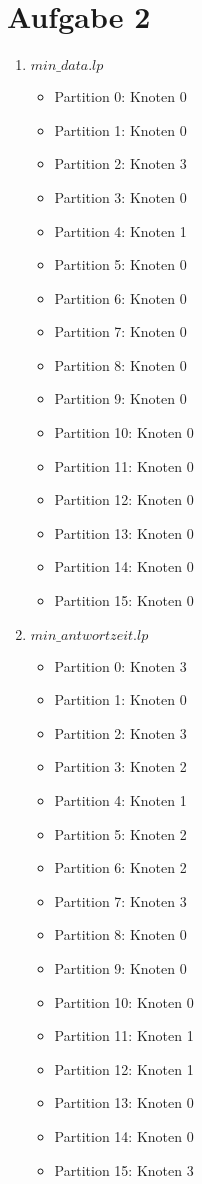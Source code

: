 \documentclass[a4paper]{article}
\begin{document}
\section*{Aufgabe 2}
\begin{enumerate}[label=\alph*)]
\item $ min\_data.lp $
\begin{itemize}
\item Partition 0: Knoten 0
\item Partition 1: Knoten 0
\item Partition 2: Knoten 3
\item Partition 3: Knoten 0
\item Partition 4: Knoten 1
\item Partition 5: Knoten 0
\item Partition 6: Knoten 0
\item Partition 7: Knoten 0
\item Partition 8: Knoten 0
\item Partition 9: Knoten 0
\item Partition 10: Knoten 0
\item Partition 11: Knoten 0
\item Partition 12: Knoten 0
\item Partition 13: Knoten 0
\item Partition 14: Knoten 0
\item Partition 15: Knoten 0
\end{itemize}

\item $ min\_antwortzeit.lp $
\begin{itemize}
\item Partition 0: Knoten 3
\item Partition 1: Knoten 0
\item Partition 2: Knoten 3
\item Partition 3: Knoten 2
\item Partition 4: Knoten 1
\item Partition 5: Knoten 2
\item Partition 6: Knoten 2
\item Partition 7: Knoten 3
\item Partition 8: Knoten 0
\item Partition 9: Knoten 0
\item Partition 10: Knoten 0
\item Partition 11: Knoten 1
\item Partition 12: Knoten 1
\item Partition 13: Knoten 0
\item Partition 14: Knoten 0
\item Partition 15: Knoten 3
\end{itemize}


\end{enumerate}
\end{document}
